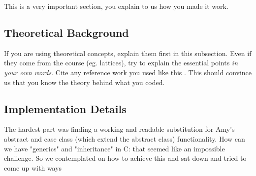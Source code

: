 This is a very important section, you explain to us how you made it work.

\subsection{Theoretical Background}
If you are using theoretical concepts, explain them first in this subsection.
Even if they come from the course (eg. lattices), try to explain the essential
points \emph{in your own words}. Cite any reference work you used like this
\cite{TigerBook}. This should convince us that you know the theory behind what
you coded. 

\subsection{Implementation Details}
%
The hardest part was finding a working and readable substitution for Amy's abstract and case class (which extend the abstract class) functionality.
How can we have "generics" and "inheritance" in C: that seemed like an impossible challenge.
So we contemplated on how to achieve this and sat down and tried to come up with ways 
